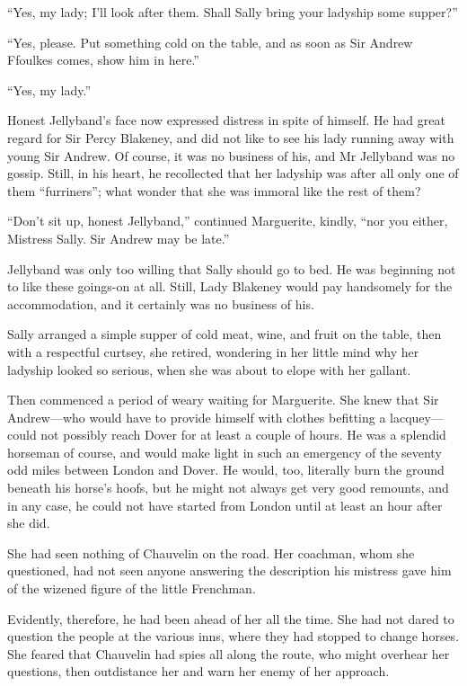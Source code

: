 \enquote{Yes, my lady; I'll look after them. Shall Sally bring your ladyship some supper?}

\enquote{Yes, please. Put something cold on the table, and as soon as Sir Andrew Ffoulkes comes, show him in here.}

\enquote{Yes, my lady.}

Honest Jellyband's face now expressed distress in spite of himself. He had great regard for Sir Percy Blakeney, and did not like to see his lady running away with young Sir Andrew. Of course, it was no business of his, and Mr Jellyband was no gossip. Still, in his heart, he recollected that her ladyship was after all only one of them \enquote{furriners}; what wonder that she was immoral like the rest of them?

\enquote{Don't sit up, honest Jellyband,} continued Marguerite, kindly, \enquote{nor you either, Mistress Sally. Sir Andrew may be late.}

Jellyband was only too willing that Sally should go to bed. He was beginning not to like these goings-on at all. Still, Lady Blakeney would pay handsomely for the accommodation, and it certainly was no business of his.

Sally arranged a simple supper of cold meat, wine, and fruit on the table, then with a respectful curtsey, she retired, wondering in her little mind why her ladyship looked so serious, when she was about to elope with her gallant.

Then commenced a period of weary waiting for Marguerite. She knew that Sir Andrew---who would have to provide himself with clothes befitting a lacquey---could not possibly reach Dover for at least a couple of hours. He was a splendid horseman of course, and would make light in such an emergency of the seventy odd miles between London and Dover. He would, too, literally burn the ground beneath his horse's hoofs, but he might not always get very good remounts, and in any case, he could not have started from London until at least an hour after she did.

She had seen nothing of Chauvelin on the road. Her coachman, whom she questioned, had not seen anyone answering the description his mistress gave him of the wizened figure of the little Frenchman.

Evidently, therefore, he had been ahead of her all the time. She had not dared to question the people at the various inns, where they had stopped to change horses. She feared that Chauvelin had spies all along the route, who might overhear her questions, then outdistance her and warn her enemy of her approach.

